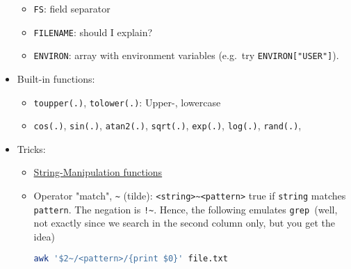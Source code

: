 \documentclass[a4paper,12pt,%
              final%
              ]{article}
\begin{document}
\begin{itemize}
\begin{itemize}
      \item \verb|FS|: field separator
      \item \verb|FILENAME|: should I explain?
      \item \verb|ENVIRON|: array with environment variables (e.g.\ try \verb|ENVIRON["USER"]|).
    \end{itemize}
  \item Built-in functions:
    \begin{itemize}
      \item \verb|toupper(.)|, \verb|tolower(.)|: Upper-, lowercase
      \item \verb|cos(.)|, \verb|sin(.)|, \verb|atan2(.)|, \verb|sqrt(.)|, \verb|exp(.)|, \verb|log(.)|, \verb|rand(.)|,
    \end{itemize}
  \item Tricks:
    \begin{itemize}
      \item \href{https://www.gnu.org/software/gawk/manual/html_node/String-Functions.html}{String-Manipulation functions}
      \item Operator "match", \verb|~| (tilde): \verb|<string>~<pattern>| true if \verb|string| matches \verb|pattern|. The negation is \verb|!~|. Hence, the following emulates \texttt{grep }(well, not exactly since we search in the second column only, but you get the idea)
\begin{lstlisting}[language=bash]
awk '$2~/<pattern>/{print $0}' file.txt
\end{lstlisting}
    \end{itemize}
\end{itemize}

\end{document}
